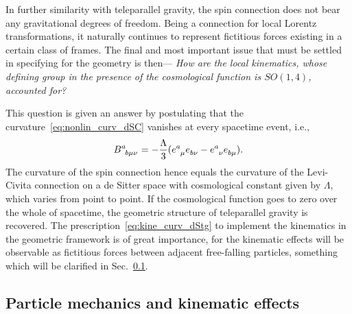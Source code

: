 \documentclass[%
5p,
times,
sort&compress
]{elsarticle}
\newcommand{\ind}{\indices}
\begin{document}
In further similarity with teleparallel gravity, the spin 
connection does not bear any gravitational degrees of freedom.  
Being a connection for local Lorentz transformations, it 
naturally continues to represent fictitious forces existing in 
a certain class of frames. The final and most important issue 
that must be settled in specifying for the geometry is then--- 
\emph{How are the local kinematics, whose defining group in the 
  presence of the cosmological function is $SO(1,4)$, accounted 
  for?}

This question is given an answer by postulating that the 
curvature~\eqref{eq:nonlin_curv_dSC} vanishes at every spacetime 
event, i.e.,
\begin{equation}
\label{eq:kine_curv_dStg}
  B\ind{^a_{b\mu\nu}} = -\frac{\Lambda}{3} (e\ind{^a_\mu} 
  e\ind{_{b\nu}} - e\ind{^a_\nu} e\ind{_{b\mu}}).
\end{equation}
The curvature of the spin connection hence equals the curvature 
of the Levi-Civita connection on a de Sitter space with 
cosmological constant given by $\Lambda$, which varies from point 
to point. If the cosmological function goes to zero over the 
whole of spacetime, the geometric structure of teleparallel 
gravity is recovered. The prescription~\eqref{eq:kine_curv_dStg} 
to implement the kinematics in the geometric framework is of 
great importance, for the kinematic effects will be observable as 
fictitious forces between adjacent free-falling particles, 
something which will be clarified in Sec.~\ref{ssec:part_mech}.


\subsection{Particle mechanics and kinematic effects}
\label{ssec:part_mech}
\end{document}
